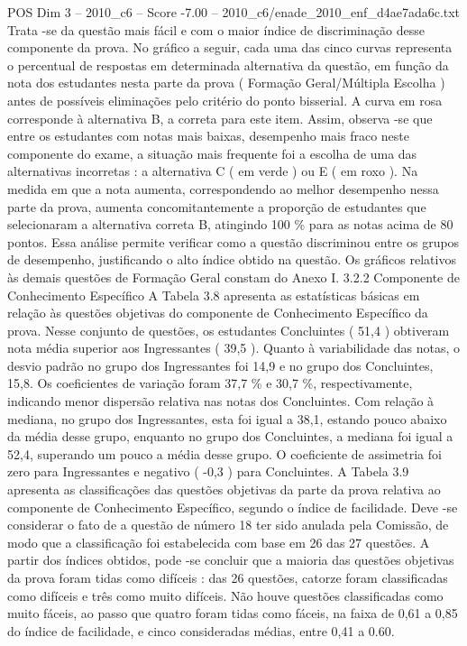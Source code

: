 \begin{textsample}{POS Dim 3 – 2010\_c6 – Score -7.00 – 2010\_c6/enade\_2010\_enf\_d4ae7ada6c.txt}
Trata -se da questão mais fácil e com o maior índice de discriminação desse componente da prova.
No gráfico a seguir, cada uma das cinco curvas representa o percentual de respostas em determinada alternativa da questão, em função da nota dos estudantes nesta parte da prova ( Formação Geral/Múltipla Escolha ) antes de possíveis eliminações pelo critério do ponto bisserial.
A curva em rosa corresponde à alternativa B, a correta para este item.
Assim, observa -se que entre os estudantes com notas mais baixas, desempenho mais fraco neste componente do exame, a situação mais frequente foi a escolha de uma das alternativas incorretas : a alternativa C ( em verde ) ou E ( em roxo ).
Na medida em que a nota aumenta, correspondendo ao melhor desempenho nessa parte da prova, aumenta concomitantemente a proporção de estudantes que selecionaram a alternativa correta B, atingindo 100 \% para as notas acima de 80 pontos.
Essa análise permite verificar como a questão discriminou entre os grupos de desempenho, justificando o alto índice obtido na questão.
Os gráficos relativos às demais questões de Formação Geral constam do Anexo I. 3.2.2 Componente de Conhecimento Específico A Tabela 3.8 apresenta as estatísticas básicas em relação às questões objetivas do componente de Conhecimento Específico da prova.
Nesse conjunto de questões, os estudantes Concluintes ( 51,4 ) obtiveram nota média superior aos Ingressantes ( 39,5 ).
Quanto à variabilidade das notas, o desvio padrão no grupo dos Ingressantes foi 14,9 e no grupo dos Concluintes, 15,8.
Os coeficientes de variação foram 37,7 \% e 30,7 \%, respectivamente, indicando menor dispersão relativa nas notas dos Concluintes.
Com relação à mediana, no grupo dos Ingressantes, esta foi igual a 38,1, estando pouco abaixo da média desse grupo, enquanto no grupo dos Concluintes, a mediana foi igual a 52,4, superando um pouco a média desse grupo.
O coeficiente de assimetria foi zero para Ingressantes e negativo ( -0,3 ) para Concluintes.
A Tabela 3.9 apresenta as classificações das questões objetivas da parte da prova relativa ao componente de Conhecimento Específico, segundo o índice de facilidade.
Deve -se considerar o fato de a questão de número 18 ter sido anulada pela Comissão, de modo que a classificação foi estabelecida com base em 26 das 27 questões.
A partir dos índices obtidos, pode -se concluir que a maioria das questões objetivas da prova foram tidas como difíceis : das 26 questões, catorze foram classificadas como difíceis e três como muito difíceis.
Não houve questões classificadas como muito fáceis, ao passo que quatro foram tidas como fáceis, na faixa de 0,61 a 0,85 do índice de facilidade, e cinco consideradas médias, entre 0,41 a 0.60.

\end{textsample}
